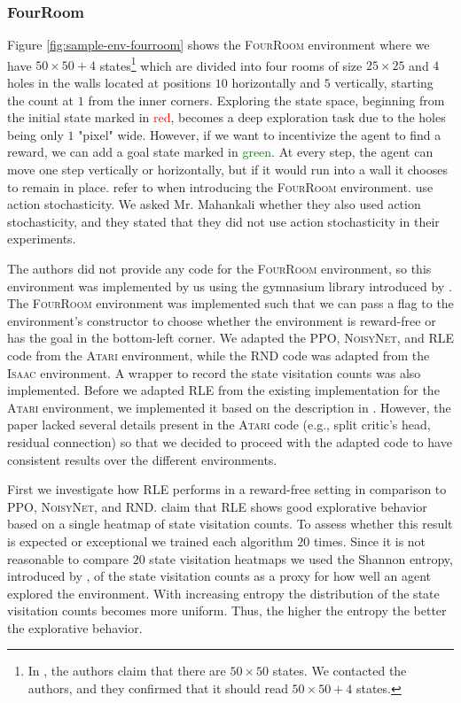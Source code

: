 \documentclass[10pt]{article} %
\begin{document}
\subsubsection{FourRoom}
Figure \ref{fig:sample-env-fourroom} shows the \textsc{FourRoom} environment where we have $50\times50 + 4$ states\footnote{In \cite{rle-paper}, the authors claim that there are $50\times 50$ states. We contacted the authors, and they confirmed that it should read $50\times 50 + 4$ states.} which are divided into four rooms of size $25\times25$ and $4$ holes in the walls located at positions $10$ horizontally and $5$ vertically, starting the count at $1$ from the inner corners. Exploring the state space, beginning from the initial state marked in \textcolor{red}{red}, becomes a deep exploration task due to the holes being only $1$ "pixel" wide. However, if we want to incentivize the agent to find a reward, we can add a goal state marked in \textcolor{green}{green}. At every step, the agent can move one step vertically or horizontally, but if it would run into a wall it chooses to remain in place. \cite{rle-paper} refer to \cite{grid-world-paper} when introducing the \textsc{FourRoom} environment. \cite{grid-world-paper} use action stochasticity. We asked Mr. Mahankali whether they also used action stochasticity, and they stated that they did not use action stochasticity in their experiments. 

The authors did not provide any code for the \textsc{FourRoom} environment, so this environment was implemented by us using the gymnasium library introduced by \cite{gymnasium-paper}. The \textsc{FourRoom} environment was implemented such that we can pass a flag to the environment's constructor to choose whether the environment is reward-free or has the goal in the bottom-left corner. We adapted the \textsc{PPO}, \textsc{NoisyNet}, and \textsc{RLE} code from the \textsc{Atari} environment, while the \textsc{RND} code was adapted from the \textsc{Isaac} environment. A wrapper to record the state visitation counts was also implemented. Before we adapted \textsc{RLE} from the existing implementation for the \textsc{Atari} environment, we implemented it based on the description in \cite{rle-paper}. However, the paper lacked several details present in the \textsc{Atari} code (e.g., split critic's head, residual connection) so that we decided to proceed with the adapted code to have consistent results over the different environments. 

First we investigate how \textsc{RLE} performs in a reward-free setting in comparison to \textsc{PPO}, \textsc{NoisyNet}, and \textsc{RND}. \cite{rle-paper} claim that \textsc{RLE} shows good explorative behavior based on a single heatmap of state visitation counts. To assess whether this result is expected or exceptional we trained each algorithm $20$ times. Since it is not reasonable to compare $20$ state visitation heatmaps we used the Shannon entropy, introduced by \cite{shannon-entropy-paper}, of the state visitation counts as a proxy for how well an agent explored the environment. With increasing entropy the distribution of the state visitation counts becomes more uniform. Thus, the higher the entropy the better the explorative behavior. 
\end{document}
